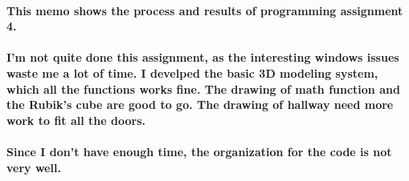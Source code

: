 \documentclass[a4paper,12pt]{texMemo}
\begin{document}
\maketitle

\paragraph{This memo shows the process and results of programming assignment 4.}
\paragraph{I'm not quite done this assignment, as the interesting windows issues waste me a lot of time. I  develped the basic 3D modeling system, which all the functions works fine. The drawing of math function and the Rubik's cube are good to go. The drawing of hallway need more work to fit all the doors.} 
\paragraph{Since I don't have enough time, the organization for the code is not very well.}
\end{document}

